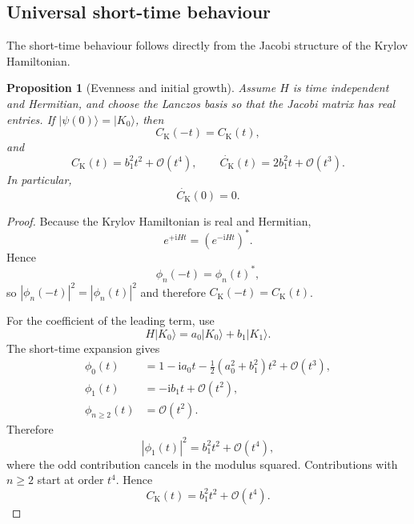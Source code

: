 \documentclass[11pt,a4paper]{article}
\theoremstyle{plain}
\newtheorem{proposition}{Proposition}[section]
\theoremstyle{definition}
\theoremstyle{remark}
\newcommand{\Ck}{C_{\mathrm K}}
\newcommand{\ii}{\mathrm i}
\begin{document}
\subsection{Universal short-time behaviour}

The short-time behaviour follows directly from the Jacobi structure of the Krylov Hamiltonian.

\begin{proposition}[Evenness and initial growth]
\label{prop:evenness}
Assume $H$ is time independent and Hermitian, and choose the Lanczos basis so that the Jacobi matrix has real entries. If $|\psi(0)\rangle=|K_0\rangle$, then
\begin{equation*}
\Ck(-t)=\Ck(t),
\end{equation*}
and
\begin{equation}
\boxed{
\Ck(t)=b_1^2t^2+\mathcal O(t^4),
\qquad
\dot{\Ck}(t)=2b_1^2t+\mathcal O(t^3).
}
\label{eq:krylov-short-time}
\end{equation}
In particular,
\begin{equation*}
\boxed{\dot{\Ck}(0)=0}.
\end{equation*}
\end{proposition}

\begin{proof}
Because the Krylov Hamiltonian is real and Hermitian,
\begin{equation*}
e^{+\ii Ht}=(e^{-\ii Ht})^*.
\end{equation*}
Hence
\begin{equation*}
\phi_n(-t)=\phi_n(t)^*,
\end{equation*}
so $|\phi_n(-t)|^2=|\phi_n(t)|^2$ and therefore $\Ck(-t)=\Ck(t)$.

For the coefficient of the leading term, use
\begin{equation*}
H|K_0\rangle=a_0|K_0\rangle+b_1|K_1\rangle.
\end{equation*}
The short-time expansion gives
\begin{align*}
\phi_0(t)
&=
1-\ii a_0t
-\frac12(a_0^2+b_1^2)t^2+\mathcal O(t^3),\\
\phi_1(t)
&=
-\ii b_1t+\mathcal O(t^2),\\
\phi_{n\geq2}(t)
&=
\mathcal O(t^2).
\end{align*}
Therefore
\begin{equation*}
|\phi_1(t)|^2=b_1^2t^2+\mathcal O(t^4),
\end{equation*}
where the odd contribution cancels in the modulus squared. Contributions with $n\geq2$ start at order $t^4$. Hence
\begin{equation*}
\Ck(t)=b_1^2t^2+\mathcal O(t^4).
\end{equation*}
\end{proof}
\end{document}
